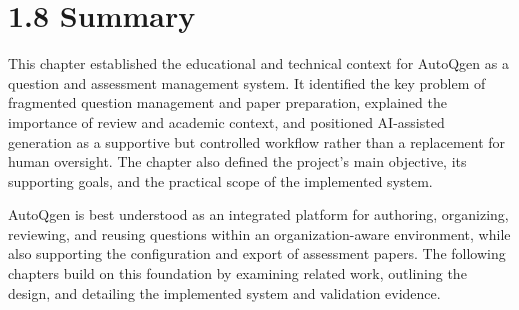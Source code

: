 \section{1.8 Summary}

This chapter established the educational and technical context for AutoQgen as a question and assessment management system. It identified the key problem of fragmented question management and paper preparation, explained the importance of review and academic context, and positioned AI-assisted generation as a supportive but controlled workflow rather than a replacement for human oversight. The chapter also defined the project’s main objective, its supporting goals, and the practical scope of the implemented system.

AutoQgen is best understood as an integrated platform for authoring, organizing, reviewing, and reusing questions within an organization-aware environment, while also supporting the configuration and export of assessment papers. The following chapters build on this foundation by examining related work, outlining the design, and detailing the implemented system and validation evidence.
